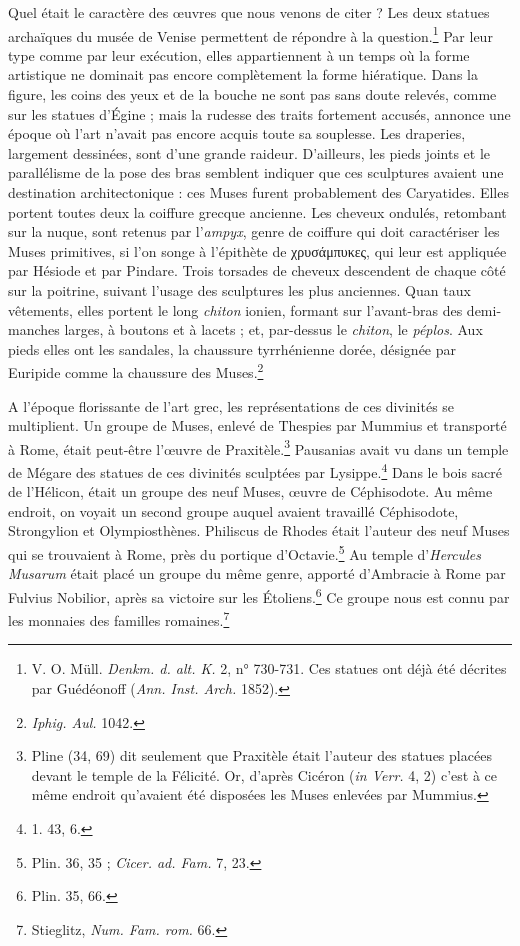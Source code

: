 \documentclass[a4paper, 11pt, oneside, polutonikogreek, french]{article}
\begin{document}
Quel était le caractère des œuvres que nous venons de citer ? Les deux statues archaïques du musée de Venise permettent de répondre à la question.\footnote{V. O. Müll. \emph{Denkm. d. alt. K.} 2, n° 730-731. Ces statues ont déjà été décrites par Guédéonoff (\emph{Ann. Inst. Arch.} 1852).} Par leur type comme par leur exécution, elles appartiennent à un temps où la forme artistique ne dominait pas encore complètement la forme hiératique. Dans la figure, les coins des yeux et de la bouche ne sont pas sans doute relevés, comme sur les statues d'Égine ; mais la rudesse des traits fortement accusés, annonce une époque où l'art n'avait pas encore acquis toute sa souplesse. Les draperies, largement dessinées, sont d'une grande raideur. D'ailleurs, les pieds joints et le parallélisme de la pose des bras semblent indiquer que ces sculptures avaient une destination architectonique : ces Muses furent probablement des Caryatides. Elles portent toutes deux la coiffure grecque ancienne. Les cheveux ondulés, retombant sur la nuque, sont retenus par l'\emph{ampyx}, genre de coiffure qui doit caractériser les Muses primitives, si l'on songe à l'épithète de χρυσάμπυκες, qui leur est appliquée par Hésiode et par Pindare. Trois torsades de cheveux descendent de chaque côté sur la poitrine, suivant l'usage des sculptures les plus anciennes. Quan taux vêtements, elles portent le long \emph{chiton} ionien, formant sur l'avant-bras des demi-manches larges, à boutons et à lacets ; et, par-dessus le \emph{chiton}, le \emph{péplos}. Aux pieds elles ont les sandales, la chaussure tyrrhénienne dorée, désignée par Euripide comme la chaussure des Muses.\footnote{\emph{Iphig. Aul.} 1042.}

A l'époque florissante de l'art grec, les représentations de ces divinités se multiplient. Un groupe de Muses, enlevé de Thespies par Mummius et transporté à Rome, était peut-être l'œuvre de Praxitèle.\footnote{Pline (34, 69) dit seulement que Praxitèle était l'auteur des statues placées devant le temple de la Félicité. Or, d'après Cicéron (\emph{in Verr.} 4, 2) c'est à ce même endroit qu'avaient été disposées les Muses enlevées par Mummius.} Pausanias avait vu dans un temple de Mégare des statues de ces divinités sculptées par Lysippe.\footnote{1. 43, 6.} Dans le bois sacré de l'Hélicon, était un groupe des neuf Muses, œuvre de Céphisodote. Au même endroit, on voyait un second groupe auquel avaient travaillé Céphisodote, Strongylion et Olympiosthènes. Philiscus de Rhodes était l'auteur des neuf Muses qui se trouvaient à Rome, près du portique d'Octavie.\footnote{Plin. 36, 35 ; \emph{Cicer. ad. Fam.} 7, 23.} Au temple d'\emph{Hercules Musarum} était placé un groupe du même genre, apporté d'Ambracie à Rome par Fulvius Nobilior, après sa victoire sur les Étoliens.\footnote{Plin. 35, 66.} Ce groupe nous est connu par les monnaies des familles romaines.\footnote{Stieglitz, \emph{Num. Fam. rom.} 66.}
\end{document}
